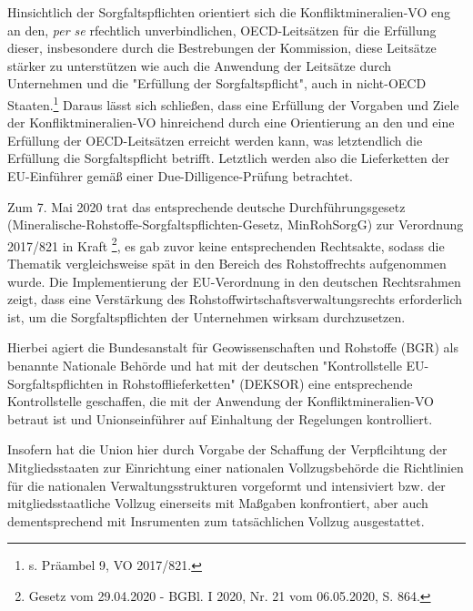 \documentclass[12pt,a4paper,oneside]{book} %
\begin{document}
Hinsichtlich der Sorgfaltspflichten orientiert sich die Konfliktmineralien-VO eng an den, \textit{per se} rfechtlich unverbindlichen, OECD-Leitsätzen \autocite{OECDleitfaden2019} für die Erfüllung dieser, insbesondere durch die Bestrebungen der Kommission, diese Leitsätze stärker zu unterstützen wie auch die Anwendung der Leitsätze durch Unternehmen und die "Erfüllung der Sorgfaltspflicht", auch in nicht-OECD Staaten.\footnote{s. Präambel 9, VO 2017/821.} Daraus lässt sich schließen, dass eine Erfüllung der Vorgaben und Ziele der Konfliktmineralien-VO hinreichend durch eine Orientierung an den und eine Erfüllung der OECD-Leitsätzen erreicht werden kann, was letztendlich die Erfüllung die Sorgfaltspflicht betrifft. Letztlich werden also die Lieferketten der EU-Einführer gemäß einer Due-Dilligence-Prüfung betrachtet.\autocite[Rn. 390]{ruttloff_lieferkettensorgfaltspflichtengesetz_2022}



Zum 7. Mai 2020 trat das entsprechende deutsche Durchführungsgesetz (Mineralische-Rohstoffe-Sorgfaltspflichten-Gesetz, MinRohSorgG) zur Verordnung 2017/821 in Kraft \footnote{Gesetz vom 29.04.2020 - BGBl. I 2020, Nr. 21 vom 06.05.2020, S. 864.}, es gab zuvor keine entsprechenden Rechtsakte, sodass die Thematik vergleichsweise spät in den Bereich des Rohstoffrechts aufgenommen wurde. Die Implementierung der EU-Verordnung in den deutschen Rechtsrahmen zeigt, dass eine Verstärkung des Rohstoffwirtschaftsverwaltungsrechts erforderlich ist, um die Sorgfaltspflichten der Unternehmen wirksam durchzusetzen.

Hierbei agiert die Bundesanstalt für Geowissenschaften und Rohstoffe (BGR) als benannte Nationale Behörde und hat mit der deutschen "Kontrollstelle EU-Sorgfaltspflichten in Rohstofflieferketten" (DEKSOR) eine entsprechende Kontrollstelle geschaffen, die mit der Anwendung der Konfliktmineralien-VO betraut ist und Unionseinführer auf Einhaltung der Regelungen kontrolliert. 

Insofern hat die Union hier durch Vorgabe der Schaffung der Verpflcihtung der Mitgliedsstaaten zur Einrichtung einer nationalen Vollzugsbehörde die Richtlinien für die nationalen Verwaltungsstrukturen vorgeformt und intensiviert bzw. der mitgliedsstaatliche Vollzug einerseits mit Maßgaben konfrontiert, aber auch dementsprechend mit Insrumenten zum tatsächlichen Vollzug ausgestattet.
\end{document}
